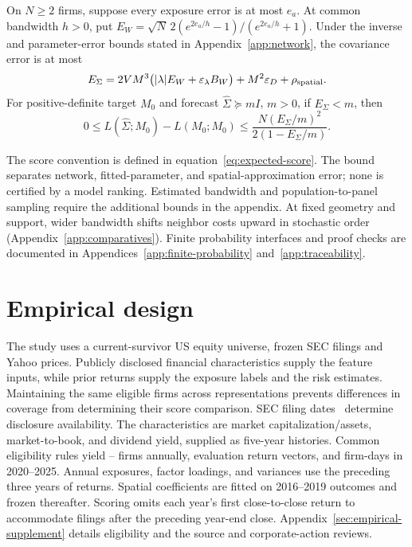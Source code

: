 \documentclass[11pt]{article}
\renewcommand{\lean}[1]{\ignorespaces}
\renewcommand{\leanok}{\ignorespaces}
\begin{document}
\begin{proposition}\label{prop:measurement-stability}
  \lean{FreeFoundations.EndToEnd.measurement_to_finance,
  FreeFoundations.EndToEnd.tasks_to_finance}\leanok{}
  On $N\ge2$ firms, suppose every exposure error is at most $e_a$.
  At common bandwidth $h>0$, put
  $E_W=\sqrt N\,2(e^{2e_a/h}-1)/(e^{2e_a/h}+1)$.
  Under the inverse and parameter-error bounds stated in
  Appendix~\ref{app:network}, the covariance error is at most
  \begin{equation}\label{eq:covariance-budget}
    E_\Sigma=2VM^3\bigl(|\lambda|E_W+
    \varepsilon_\lambda B_W\bigr)+M^2\varepsilon_D+\rho_{\rm spatial}.
  \end{equation}
  For positive-definite target $M_0$ and forecast
  $\widehat\Sigma\succeq mI$, $m>0$, if $E_\Sigma<m$, then
  \[
    0\le L(\widehat\Sigma;M_0)-L(M_0;M_0)
    \le\frac{N{(E_\Sigma/m)}^2}{2(1-E_\Sigma/m)}.
  \]
\end{proposition}
The score convention is defined in equation~\eqref{eq:expected-score}.
The bound separates network, fitted-parameter, and spatial-approximation error;
none is certified by a model ranking. Estimated bandwidth and
population-to-panel
sampling require the additional bounds in the appendix.
At fixed geometry and support, wider bandwidth shifts neighbor costs upward in
stochastic order (Appendix~\ref{app:comparatives}). Finite
probability interfaces
and proof checks are documented in Appendices~\ref{app:finite-probability}
and~\ref{app:traceability}.

\section{Empirical design}\label{sec:chronology}
The study uses a current-survivor US equity universe, frozen SEC filings and
Yahoo prices. Publicly disclosed financial characteristics supply the feature
inputs, while prior returns supply the exposure labels and the risk
estimates. Maintaining the same eligible firms across representations
prevents differences in coverage from determining their score comparison.
SEC filing dates~\cite{secapi} determine disclosure availability.
The characteristics are market capitalization/assets, market-to-book, and
dividend yield, supplied as five-year histories. Common eligibility rules yield
\MinFirms{}--\MaxFirms{} firms annually, \ScoredDates{} evaluation
return vectors,
and \FirmDays{} firm-days in 2020--2025. Annual exposures, factor loadings, and
variances use the preceding three years of returns. Spatial coefficients are
fitted on 2016--2019 outcomes and frozen thereafter. Scoring omits each year's
first close-to-close return to accommodate filings after the preceding year-end
close. Appendix~\ref{sec:empirical-supplement} details eligibility
and the source
and corporate-action reviews.
\end{document}
